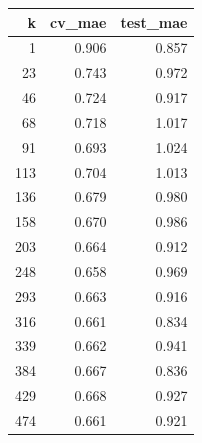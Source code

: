 \begin{tabular}{rrr}
\toprule
k & cv_mae & test_mae \\
\midrule
1 & 0.906 & 0.857 \\
23 & 0.743 & 0.972 \\
46 & 0.724 & 0.917 \\
68 & 0.718 & 1.017 \\
91 & 0.693 & 1.024 \\
113 & 0.704 & 1.013 \\
136 & 0.679 & 0.980 \\
158 & 0.670 & 0.986 \\
203 & 0.664 & 0.912 \\
248 & 0.658 & 0.969 \\
293 & 0.663 & 0.916 \\
316 & 0.661 & 0.834 \\
339 & 0.662 & 0.941 \\
384 & 0.667 & 0.836 \\
429 & 0.668 & 0.927 \\
474 & 0.661 & 0.921 \\
\bottomrule
\end{tabular}
